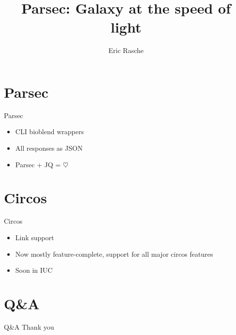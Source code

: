 \documentclass[12pt]{phage3slides} %
\title[Parsec]{Parsec: Galaxy at the speed of light}
\author[ER]{Eric Rasche}
\begin{document}
\frame{\titlepage}


\section{Parsec}
\begin{frame}{Parsec}
	\begin{itemize}
		\item CLI bioblend wrappers
		\item All responses as JSON
		\item Parsec + JQ = $\heartsuit$
	\end{itemize}
\end{frame}



\section{Circos}
\begin{frame}{Circos}
	\begin{itemize}
		\item Link support
		\item Now mostly feature-complete, support for all major circos features
		\item Soon in IUC
	\end{itemize}
\end{frame}



\section{Q\&A}
\begin{frame}{Q\&A}
	Thank you \\\ \\
	\begin{center}
		\begin{tabular}{rl}
			\end{tabular}\\[1cm]
			\fundingNSFABIannotation
	\end{center}
\end{frame}
\end{document}
